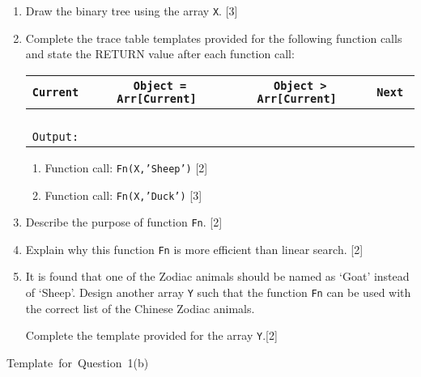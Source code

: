 \begin{enumerate}
\item Draw the binary tree using the array \texttt{X}. \hfill{}{[}3{]}
\item Complete the trace table templates provided for the following function
calls and state the RETURN value after each function call: 
\noindent \begin{center}
\begin{tabular}{|c|c|c|c|}
\hline 
\texttt{Current } & \texttt{Object = Arr{[}Current{]} } & \texttt{Object > Arr{[}Current{]} } & \texttt{Next }\tabularnewline
\hline 
 &  &  & \tabularnewline
\hline 
 &  &  & \tabularnewline
\hline 
 &  &  & \tabularnewline
\hline 
 &  &  & \tabularnewline
\hline 
\multicolumn{4}{|l|}{\texttt{Output:}}\tabularnewline
\hline 
\end{tabular}
\par\end{center}
\begin{enumerate}
\item Function call: \texttt{Fn(X,'Sheep')} \hfill{}{[}2{]}
\item Function call: \texttt{Fn(X,'Duck')} \hfill{}{[}3{]}
\end{enumerate}
\item Describe the purpose of function \texttt{Fn}. \hfill{}{[}2{]}
\item Explain why this function \texttt{Fn} is more efficient than linear
search.\hfill{} {[}2{]}
\item It is found that one of the Zodiac animals should be named as \textquoteleft Goat\textquoteright{}
instead of \textquoteleft Sheep\textquoteright . Design another array
\texttt{Y} such that the function \texttt{Fn} can be used with the
correct list of the Chinese Zodiac animals. 

Complete the template provided for the array \texttt{Y}.\hfill{}{[}2{]}
\end{enumerate}
\begin{description}
\item [{Template~for~Question~1(b)}]~
\end{description}
